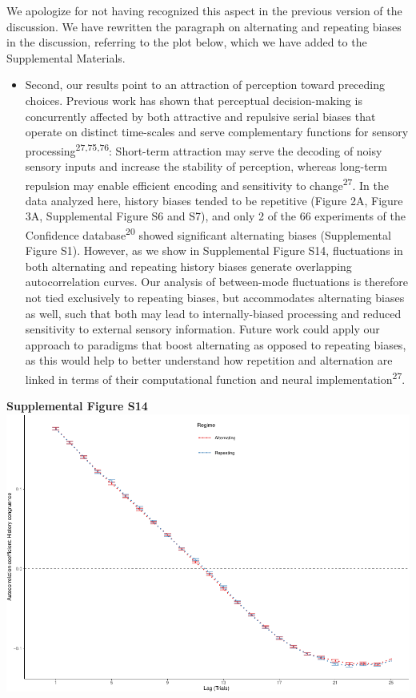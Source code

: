 \documentclass[
]{article}
\providecommand{\tightlist}{%
  \setlength{\itemsep}{0pt}\setlength{\parskip}{0pt}}
\begin{document}
We apologize for not having recognized this aspect in the previous
version of the discussion. We have rewritten the paragraph on
alternating and repeating biases in the discussion, referring to the
plot below, which we have added to the Supplemental Materials.

\begin{itemize}
\tightlist
\item
  Second, our results point to an attraction of perception toward
  preceding choices. Previous work has shown that perceptual
  decision-making is concurrently affected by both attractive and
  repulsive serial biases that operate on distinct time-scales and serve
  complementary functions for sensory
  processing\textsuperscript{27,75,76}: Short-term attraction may serve
  the decoding of noisy sensory inputs and increase the stability of
  perception, whereas long-term repulsion may enable efficient encoding
  and sensitivity to change\textsuperscript{27}. In the data analyzed
  here, history biases tended to be repetitive (Figure 2A, Figure 3A,
  Supplemental Figure S6 and S7), and only 2 of the 66 experiments of
  the Confidence database\textsuperscript{20} showed significant
  alternating biases (Supplemental Figure S1). However, as we show in
  Supplemental Figure S14, fluctuations in both alternating and
  repeating history biases generate overlapping autocorrelation curves.
  Our analysis of between-mode fluctuations is therefore not tied
  exclusively to repeating biases, but accommodates alternating biases
  as well, such that both may lead to internally-biased processing and
  reduced sensitivity to external sensory information. Future work could
  apply our approach to paradigms that boost alternating as opposed to
  repeating biases, as this would help to better understand how
  repetition and alternation are linked in terms of their computational
  function and neural implementation\textsuperscript{27}.
\end{itemize}

\textbf{Supplemental Figure S14}
\includegraphics{modes_mouse_rev1b_files/figure-latex/Supplemental_Figure_S14_print-1.pdf}
\end{document}
